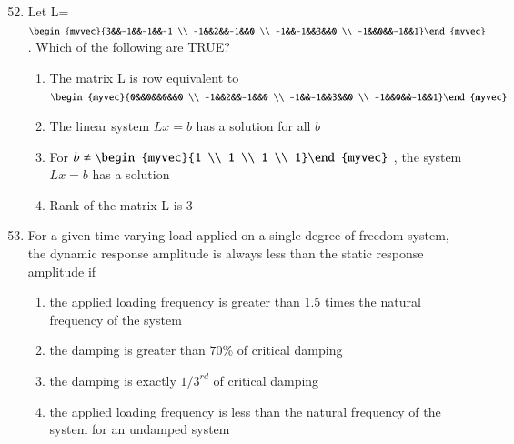 \documentclass[journal]{IEEEtran}
\theoremstyle{remark}
\begin{document}
\begin{enumerate}[itemsep=1em]
\setcounter{enumi}{51}
\item Let L=$\begin{myvec}{3&&-1&&-1&&-1 \\ -1&&2&&-1&&0 \\ -1&&-1&&3&&0 \\ -1&&0&&-1&&1}\end{myvec}$ . Which of the following are TRUE?
\begin{enumerate}[leftmargin=2.5em, labelsep=0.5em, itemsep=0.5em]
    \item The matrix L is row equivalent to $\begin{myvec}{0&&0&&0&&0 \\ -1&&2&&-1&&0 \\ -1&&-1&&3&&0 \\ -1&&0&&-1&&1}\end{myvec} $
    \item  The linear system $Lx=b$ has a solution for all $b$
    \item For $b \neq \begin{myvec}{1 \\ 1 \\ 1 \\ 1}\end{myvec}$ ,  the system $Lx=b$ has a solution 
    \item Rank of the matrix L is 3 
\end{enumerate}
\end{enumerate}

\begin{enumerate}[itemsep=1em]
\setcounter{enumi}{52}
\item For a given time varying load applied on a single degree of freedom system, the dynamic response amplitude is always less than the static response amplitude if 
\begin{enumerate}[leftmargin=2.5em, labelsep=0.5em, itemsep=0.5em]
    \item the applied loading frequency is greater than 1.5 times the natural frequency of the system
    \item the damping is greater than $70\%$ of critical damping 
    \item the damping is exactly $1/3^{rd}$ of critical damping 
    \item the applied loading frequency is less than the natural frequency of the system for an undamped system 
    
\end{enumerate}
\end{enumerate}
\end{document}
